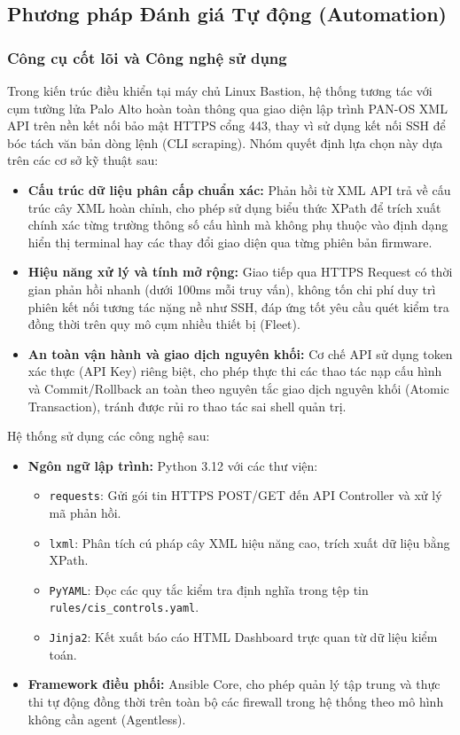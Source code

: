 \documentclass[12pt,a4paper]{article}
\begin{document}
\subsection{Phương pháp Đánh giá Tự động (Automation)}

\subsubsection{Công cụ cốt lõi và Công nghệ sử dụng}
\noindent Trong kiến trúc điều khiển tại máy chủ Linux Bastion, hệ thống tương tác với cụm tường lửa Palo Alto hoàn toàn thông qua giao diện lập trình PAN-OS XML API trên nền kết nối bảo mật HTTPS cổng 443, thay vì sử dụng kết nối SSH để bóc tách văn bản dòng lệnh (CLI scraping). Nhóm quyết định lựa chọn này dựa trên các cơ sở kỹ thuật sau:

\begin{itemize}
    \item \textbf{Cấu trúc dữ liệu phân cấp chuẩn xác:} Phản hồi từ XML API trả về cấu trúc cây XML hoàn chỉnh, cho phép sử dụng biểu thức XPath để trích xuất chính xác từng trường thông số cấu hình mà không phụ thuộc vào định dạng hiển thị terminal hay các thay đổi giao diện qua từng phiên bản firmware.
    \item \textbf{Hiệu năng xử lý và tính mở rộng:} Giao tiếp qua HTTPS Request có thời gian phản hồi nhanh (dưới 100ms mỗi truy vấn), không tốn chi phí duy trì phiên kết nối tương tác nặng nề như SSH, đáp ứng tốt yêu cầu quét kiểm tra đồng thời trên quy mô cụm nhiều thiết bị (Fleet).
    \item \textbf{An toàn vận hành và giao dịch nguyên khối:} Cơ chế API sử dụng token xác thực (API Key) riêng biệt, cho phép thực thi các thao tác nạp cấu hình và Commit/Rollback an toàn theo nguyên tắc giao dịch nguyên khối (Atomic Transaction), tránh được rủi ro thao tác sai shell quản trị.
\end{itemize}

\noindent Hệ thống sử dụng các công nghệ sau:
\begin{itemize}
    \item \textbf{Ngôn ngữ lập trình:} Python 3.12 với các thư viện:
    \begin{itemize}
        \item \texttt{requests}: Gửi gói tin HTTPS POST/GET đến API Controller và xử lý mã phản hồi.
        \item \texttt{lxml}: Phân tích cú pháp cây XML hiệu năng cao, trích xuất dữ liệu bằng XPath.
        \item \texttt{PyYAML}: Đọc các quy tắc kiểm tra định nghĩa trong tệp tin \texttt{rules/cis\_controls.yaml}.
        \item \texttt{Jinja2}: Kết xuất báo cáo HTML Dashboard trực quan từ dữ liệu kiểm toán.
    \end{itemize}
    \item \textbf{Framework điều phối:} Ansible Core, cho phép quản lý tập trung và thực thi tự động đồng thời trên toàn bộ các firewall trong hệ thống theo mô hình không cần agent (Agentless).
\end{itemize}
\end{document}
